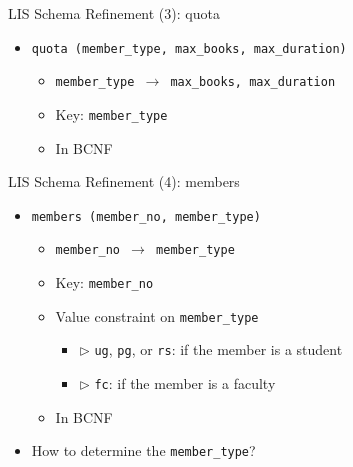 \documentclass[aspectratio=169, xcolor=dvipsnames]{beamer}
\begin{document}
\begin{frame}{LIS Schema Refinement (3): quota}
    \begin{itemize}
        \item \texttt{quota (member\_type, max\_books, max\_duration)}
        \begin{itemize}
            \item \texttt{member\_type $\rightarrow$ max\_books, max\_duration}
            \item Key: \texttt{member\_type}
            \item In BCNF
        \end{itemize}
    \end{itemize}
\end{frame}

\begin{frame}{LIS Schema Refinement (4): members}
    \begin{itemize}
        \item \texttt{members (member\_no, member\_type)}
        \begin{itemize}
            \item \texttt{member\_no $\rightarrow$ member\_type}
            \item Key: \texttt{member\_no}
            \item Value constraint on \texttt{member\_type}
            \begin{itemize}
                \item $\triangleright$ \texttt{ug}, \texttt{pg}, or \texttt{rs}: if the member is a student
                \item $\triangleright$ \texttt{fc}: if the member is a faculty
            \end{itemize}
            \item In BCNF
        \end{itemize}
        \item How to determine the \texttt{member\_type}?
    \end{itemize}
\end{frame}
\end{document}
